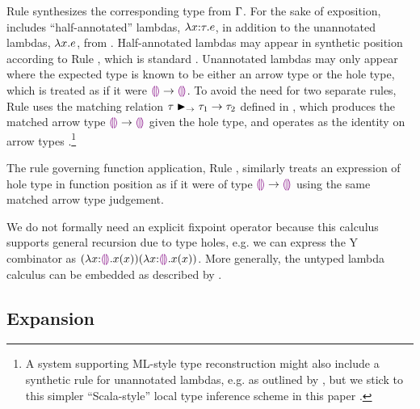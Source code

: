 Rule  synthesizes the corresponding type from $\Gamma$.
For the sake of exposition, \HazelnutLive includes ``half-annotated'' lambdas, $\lambda x{:}\tau.e$, in addition to the unannotated lambdas, $\lambda x.e$, from \Hazelnut.
%
Half-annotated lambdas may appear in synthetic position according to Rule , which is standard \cite{Chlipala:2005da}.
%
Unannotated lambdas may only appear where the expected type is known to be either an arrow type or the hole type, which is treated as if it were $\textcolor{violet}{\llparenthesis}\textcolor{violet}{\rrparenthesis} \rightarrow \textcolor{violet}{\llparenthesis}\textcolor{violet}{\rrparenthesis}$.
%
To avoid the need for two separate rules, Rule  uses the matching relation $\tau \blacktriangleright_{\rightarrow} \tau_1 \rightarrow \tau_2$ defined in , which produces the matched arrow type $\textcolor{violet}{\llparenthesis}\textcolor{violet}{\rrparenthesis} \rightarrow \textcolor{violet}{\llparenthesis}\textcolor{violet}{\rrparenthesis}$ given the hole type, and operates as the identity on arrow types \cite{DBLP:conf/snapl/SiekVCB15,DBLP:conf/popl/GarciaC15}.\footnote{A system supporting ML-style type reconstruction \cite{damas1982principal} might also include a synthetic rule for unannotated lambdas, e.g. as outlined by \citet{DBLP:conf/icfp/DunfieldK13}, but we stick to this simpler ``Scala-style'' local type inference scheme in this paper \cite{Pierce:2000ve,Odersky:2001lb}.}
%
%
%
%

The rule governing function application, Rule , similarly treats an expression of hole type in function position as if it were of type $\textcolor{violet}{\llparenthesis}\textcolor{violet}{\rrparenthesis} \rightarrow \textcolor{violet}{\llparenthesis}\textcolor{violet}{\rrparenthesis}$ using the same matched arrow type judgement.

We do not formally need an explicit fixpoint operator because this calculus supports general recursion due to type holes, e.g. we can express the Y combinator as $(\lambda x{:}\textcolor{violet}{\llparenthesis}\textcolor{violet}{\rrparenthesis}.x(x)) (\lambda x{:}\textcolor{violet}{\llparenthesis}\textcolor{violet}{\rrparenthesis}.x(x))$. More generally, the untyped lambda calculus can be embedded as described by \citet{Siek06a}.

\vspace{-4px}
\subsection{Expansion}
\label{sec:expansion}
\vspace{-1px}

